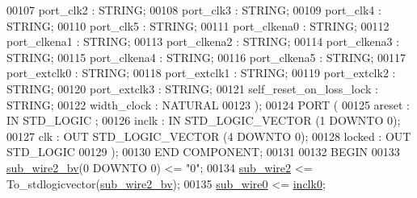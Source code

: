 \begin{DoxyCode}
{00107         port\_clk2       : \textcolor{comment}{STRING};
00108         port\_clk3       : \textcolor{comment}{STRING};
00109         port\_clk4       : \textcolor{comment}{STRING};
00110         port\_clk5       : \textcolor{comment}{STRING};
00111         port\_clkena0        : \textcolor{comment}{STRING};
00112         port\_clkena1        : \textcolor{comment}{STRING};
00113         port\_clkena2        : \textcolor{comment}{STRING};
00114         port\_clkena3        : \textcolor{comment}{STRING};
00115         port\_clkena4        : \textcolor{comment}{STRING};
00116         port\_clkena5        : \textcolor{comment}{STRING};
00117         port\_extclk0        : \textcolor{comment}{STRING};
00118         port\_extclk1        : \textcolor{comment}{STRING};
00119         port\_extclk2        : \textcolor{comment}{STRING};
00120         port\_extclk3        : \textcolor{comment}{STRING};
00121         self\_reset\_on\_loss\_lock     : \textcolor{comment}{STRING};
00122         width\_clock     : \textcolor{comment}{NATURAL}
00123     );
00124     \textcolor{keywordflow}{PORT} (
00125             areset  : \textcolor{keywordflow}{IN} \textcolor{comment}{STD\_LOGIC} ;
00126             inclk   : \textcolor{keywordflow}{IN} \textcolor{comment}{STD\_LOGIC\_VECTOR} (\textcolor{vhdllogic}{}\textcolor{vhdllogic}{1} \textcolor{keywordflow}{DOWNTO} \textcolor{vhdllogic}{}\textcolor{vhdllogic}{0});
00127             clk : \textcolor{keywordflow}{OUT} \textcolor{comment}{STD\_LOGIC\_VECTOR} (\textcolor{vhdllogic}{}\textcolor{vhdllogic}{4} \textcolor{keywordflow}{DOWNTO} \textcolor{vhdllogic}{}\textcolor{vhdllogic}{0});
00128             locked  : \textcolor{keywordflow}{OUT} \textcolor{comment}{STD\_LOGIC} 
00129     );
00130     \textcolor{keywordflow}{END} \textcolor{keywordflow}{COMPONENT};
00131 
00132 \textcolor{vhdlkeyword}{BEGIN}
00133     \textcolor{vhdlchar}{\hyperlink{classpll_1_1_s_y_n_abba109be51ad5c5e0095a8d5fe1e3c85}{sub\_wire2\_bv}}\textcolor{vhdlchar}{(}\textcolor{vhdllogic}{}\textcolor{vhdllogic}{0} \textcolor{keywordflow}{DOWNTO} \textcolor{vhdllogic}{}\textcolor{vhdllogic}{0}\textcolor{vhdlchar}{)} \textcolor{vhdlchar}{<=} \textcolor{vhdllogic}{"0"};
00134     \textcolor{vhdlchar}{\hyperlink{classpll_1_1_s_y_n_a205f2292eed10dd71c2a24fab09e93ae}{sub\_wire2}}    \textcolor{vhdlchar}{<=} \textcolor{vhdlchar}{To\_stdlogicvector}\textcolor{vhdlchar}{(}\textcolor{vhdlchar}{\hyperlink{classpll_1_1_s_y_n_abba109be51ad5c5e0095a8d5fe1e3c85}{sub\_wire2\_bv}}\textcolor{vhdlchar}{)};
00135     \textcolor{vhdlchar}{\hyperlink{classpll_1_1_s_y_n_aca40f2d2e88330e7729fc8f89d1e2366}{sub\_wire0}}    \textcolor{vhdlchar}{<=} \textcolor{vhdlchar}{\hyperlink{classpll_a9463f4cc62782c2faac516c942dcb5db}{inclk0}};
}
\end{DoxyCode}
